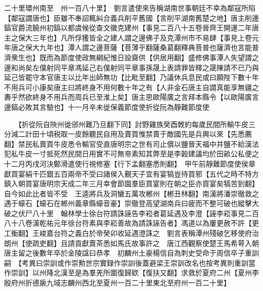 二十里環州南至　州一百八十里】　劉言遣使來告稱湖南世事朝廷不幸為鄰寇所陷【鄰寇謂唐也】臣雖不奉詔輒糾合義兵削平舊國【言削平湖南舊楚之地】唐主削邊鎬官爵流饒州初鎬以都虞候從查文徽克建州【事見二百八十五卷晉齊王開運二年唐主之保大三年也】凡所俘獲皆全之建人謂之邊佛子及克潭州市不易肆【事見上卷元年唐之保大九年也】潭人謂之邊菩薩【菩薄乎翻薩桑葛翻釋典菩普也薩濟也言能普濟衆生也】既而為節度使政無綱紀惟日設齋供【供居用翻】盛修佛事潭人失望謂之邊和尚矣左僕射同平章馮延己右僕射同平章事孫晟上表請罪皆釋之晟陳請不已乃與延己皆罷守本官唐主以比年出師無功【比毗至翻】乃議休兵息民或曰願陛下數十年不用兵可小康矣唐主曰將終身不用何數十年之有【人非金石唐主自謂真能享無疆之夀乎然欲終身不用兵而周兵已至淮上矣】唐主思歐陽廣之言拜本縣令【以歐陽廣言邊鎬必敗其言驗也】十一月辛未徙保義節度使折從阮為靜難節度使

　　【折從阮自陜州徙邠州難乃旦翻下同】討野雞族癸酉敇約每歲民間所輸牛皮三分減二計田十頃税取一皮餘聽民自用及賣買惟禁賣于敵國先是兵興以來【先悉薦翻】禁民私賣買牛皮悉令輸官受直唐明宗之世有司止償以鹽晉天福中并鹽不給漢法犯私牛皮一寸抵死然民間日用實不可無帝素知其弊至是李穀建議均於田畝公私便之　十二月丙戌河決鄭滑遣使行視修塞【行下孟翻塞悉則翻】　甲午前靜難節度使侯章獻買宴絹千匹銀五百兩帝不受曰諸侯入覲天子宜有宴犒豈待買邪【五代之時不特方鎮入朝買宴唐明宗天成二年三月幸會節園羣臣買宴則在朝之臣亦買宴矣犒苦到翻】自今如此比者皆不受　王逵將兵及洞蠻五萬攻郴州【郴丑林翻】南漢將潘崇徹救之遇于蠔石【蠔石在郴州義章縣蠔音豪】崇徹登高望湖南兵曰疲而不整可破也縱擊大破之伏尸八十里　翰林學士徐台符請誅誣告李崧者葛延遇及李澄【誣李崧事見二百八十八卷漢乾祐元年徐台符素與李崧善故為請誅誣告者】馮道以為屢更赦不許【更工衡翻】王峻嘉台符之義白於帝癸卯收延遇澄誅之　劉言表稱潭州殘破乞移使府治朗州【使疏吏翻】且請貢獻賣茶悉如馬氏故事許之　唐江西觀察使楚王馬希萼入朝唐主留之後數年卒於金陵諡曰恭孝　初麟州土豪楊信自為刺史受命于周信卒子重訓嗣　【考異曰崇訓或作崇勲世宗實録作崇訓後蓋避梁王崇訓改名也按考異則重訓當作崇訓】以州降北漢至是為羣羌所圍復歸欵【復扶又翻】求救於夏府二州【夏州李殷府州折德扆九域志麟州西北至夏州一百二十里東北至府州一百二十里】

